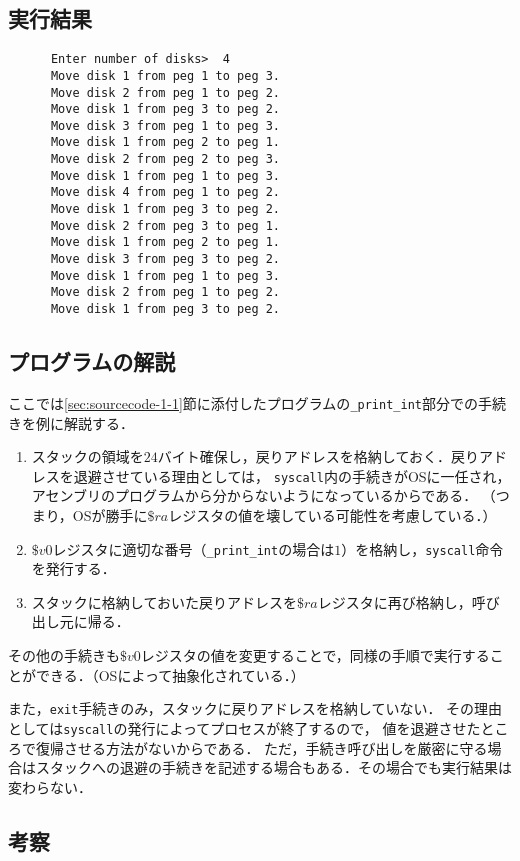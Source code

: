 \documentclass[a4j,11pt]{jarticle}
\begin{document}
\subsection{実行結果}
\begin{verbatim}
      Enter number of disks>  4
      Move disk 1 from peg 1 to peg 3.
      Move disk 2 from peg 1 to peg 2.
      Move disk 1 from peg 3 to peg 2.
      Move disk 3 from peg 1 to peg 3.
      Move disk 1 from peg 2 to peg 1.
      Move disk 2 from peg 2 to peg 3.
      Move disk 1 from peg 1 to peg 3.
      Move disk 4 from peg 1 to peg 2.
      Move disk 1 from peg 3 to peg 2.
      Move disk 2 from peg 3 to peg 1.
      Move disk 1 from peg 2 to peg 1.
      Move disk 3 from peg 3 to peg 2.
      Move disk 1 from peg 1 to peg 3.
      Move disk 2 from peg 1 to peg 2.
      Move disk 1 from peg 3 to peg 2.           
\end{verbatim}

\subsection{プログラムの解説}
ここでは\ref{sec:sourcecode-1-1}節に添付したプログラムの{\tt \_print\_int}部分での手続きを例に解説する．
\begin{enumerate}
      \item スタックの領域を$24$バイト確保し，戻りアドレスを格納しておく．戻りアドレスを退避させている理由としては，
      {\tt syscall}内の手続きがOSに一任され，アセンブリのプログラムから分からないようになっているからである．
      （つまり，OSが勝手に$\$ra$レジスタの値を壊している可能性を考慮している．）
      \item $\$v0$レジスタに適切な番号（{\tt \_print\_int}の場合は$1$）を格納し，{\tt syscall}命令を発行する．
      \item スタックに格納しておいた戻りアドレスを$\$ra$レジスタに再び格納し，呼び出し元に帰る．
\end{enumerate}

その他の手続きも$\$v0$レジスタの値を変更することで，同様の手順で実行することができる．（OSによって抽象化されている．）

また，{\tt exit}手続きのみ，スタックに戻りアドレスを格納していない．
その理由としては{\tt syscall}の発行によってプロセスが終了するので，
値を退避させたところで復帰させる方法がないからである．
ただ，手続き呼び出しを厳密に守る場合はスタックへの退避の手続きを記述する場合もある．その場合でも実行結果は変わらない．

\subsection{考察}
\end{document}
